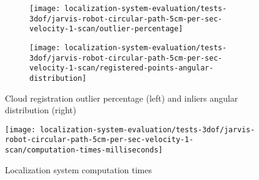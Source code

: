 \begin{figure}[ht]
	\centering
	\begin{subfigure}[h]{.497\textwidth}
		\centering
		\texttt{[image: localization-system-evaluation/tests-3dof/jarvis-robot-circular-path-5cm-per-sec-velocity-1-scan/outlier-percentage]}
	\end{subfigure}
	\begin{subfigure}[h]{.497\textwidth}
		\centering
		\texttt{[image: localization-system-evaluation/tests-3dof/jarvis-robot-circular-path-5cm-per-sec-velocity-1-scan/registered-points-angular-distribution]}
	\end{subfigure}
	\caption{Cloud registration outlier percentage (left) and inliers angular distribution (right)}
	\label{fig:localization-system-evaluation_jarvis-robot-circular-path-5cm-per-sec-velocity-1-scan_analysis}
\end{figure}

\begin{figure}[ht]
	\centering
	\texttt{[image: localization-system-evaluation/tests-3dof/jarvis-robot-circular-path-5cm-per-sec-velocity-1-scan/computation-times-milliseconds]}
	\caption{Localization system computation times}
	\label{fig:localization-system-evaluation_jarvis-robot-circular-path-5cm-per-sec-velocity-1-scan_computation-time}
\end{figure}
